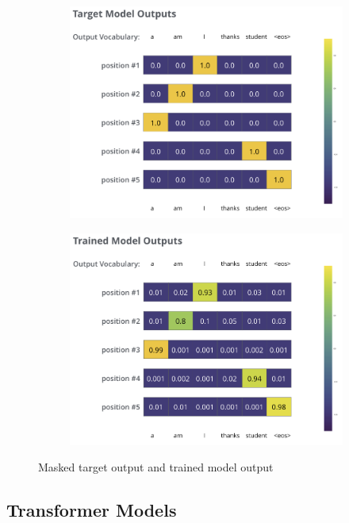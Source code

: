 \documentclass[11pt]{article}
\begin{document}
\begin{figure}[tbh]
	\begin{subfigure}[t]{0.45\linewidth}
		\includegraphics[width=\linewidth]{img/transformer_teacher_forcing}
	\end{subfigure}
	\hfill
	\begin{subfigure}[t]{0.45\linewidth}
		\includegraphics[width=\linewidth]{img/transformer_teacher_forcing2}
	\end{subfigure}
	\caption{Masked target output and trained model output}
	\label{fig:transformerteacherforcing}
\end{figure}

\subsection{Transformer Models}
\end{document}
